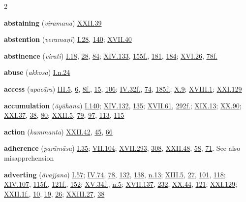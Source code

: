 \begin{multicols}{2}
\begin{vismHanging}
\par\textbf{abstaining} (\emph{viramana}) \hyperlink{XXII.39}{XXII.39}{}
\par\textbf{abstention} (\emph{veramaṇī}) \hyperlink{I.28}{I.28}{}, \hyperlink{I.140}{140}{}; \hyperlink{XVII.40}{XVII.40}{}
\par\textbf{abstinence} (\emph{virati}) \hyperlink{I.18}{I.18}{}, \hyperlink{I.28}{28}{}, \hyperlink{I.84}{84}{}; \hyperlink{XIV.133}{XIV.133}{}, \hyperlink{XIV.155}{155f.}{}, \hyperlink{XIV.181}{181}{}, \hyperlink{XIV.184}{184}{}; \hyperlink{XVI.26}{XVI.26}{}, \hyperlink{XVI.78}{78f.}{}
\par\textbf{abuse} (\emph{akkosa}) \hyperlink{I.n24}{I.n.24}{}
\par\textbf{access} (\emph{upacāra}) \hyperlink{III.5}{III.5}{}, \hyperlink{III.6}{6}{}, \hyperlink{III.8}{8f.}{}, \hyperlink{III.15}{15}{}, \hyperlink{III.106}{106}{}; \hyperlink{IV.32}{IV.32f.}{}, \hyperlink{IV.74}{74}{}, \hyperlink{IV.185}{185f.}{}; \hyperlink{X.9}{X.9}{}; \hyperlink{XVIII.1}{XVIII.1}{}; \hyperlink{XXI.129}{XXI.129}{}
\par\textbf{accumulation} (\emph{āyūhana}) \hyperlink{I.140}{I.140}{}; \hyperlink{XIV.132}{XIV.132}{}, \hyperlink{XIV.135}{135}{}; \hyperlink{XVII.61}{XVII.61}{}, \hyperlink{XVII.292}{292f.}{}; \hyperlink{XIX.13}{XIX.13}{}; \hyperlink{XX.90}{XX.90}{}; \hyperlink{XXI.37}{XXI.37}{}, \hyperlink{XXI.38}{38}{}, \hyperlink{XXI.80}{80}{}; \hyperlink{XXII.5}{XXII.5}{}, \hyperlink{XXII.79}{79}{}, \hyperlink{XXII.97}{97}{}, \hyperlink{XXII.113}{113}{}, \hyperlink{XXII.115}{115}{}
\par\textbf{action} (\emph{kammanta}) \hyperlink{XXII.42}{XXII.42}{}, \hyperlink{XXII.45}{45}{}, \hyperlink{XXII.66}{66}{}
\par\textbf{adherence} (\emph{parāmāsa}) \hyperlink{I.35}{I.35}{}; \hyperlink{VII.104}{VII.104}{}; \hyperlink{XVII.293}{XVII.293}{}, \hyperlink{XVII.308}{308}{}, \hyperlink{XXII.48}{XXII.48}{}, \hyperlink{XXII.58}{58}{}, \hyperlink{XXII.71}{71}{}. See also misapprehension 
\par\textbf{adverting} (\emph{āvajjana}) \hyperlink{I.57}{I.57}{}; \hyperlink{IV.74}{IV.74}{}, \hyperlink{IV.78}{78}{}, \hyperlink{IV.132}{132}{}, \hyperlink{IV.138}{138}{}, \hyperlink{IV.n13}{n.13}{}; \hyperlink{XIII.5}{XIII.5}{}, \hyperlink{XIII.27}{27}{}, \hyperlink{XIII.101}{101}{}, \hyperlink{XIII.118}{118}{}; \hyperlink{XIV.107}{XIV.107}{}, \hyperlink{XIV.115}{115f.}{}, \hyperlink{XIV.121}{121f.}{}, \hyperlink{XIV.152}{152}{}; \hyperlink{XV.34}{XV.34f.}{}, \hyperlink{XV.n5}{n.5}{}; \hyperlink{XVII.137}{XVII.137}{}, \hyperlink{XVII.232}{232}{}; \hyperlink{XX.44}{XX.44}{}, \hyperlink{XX.121}{121}{}; \hyperlink{XXI.129}{XXI.129}{}; \hyperlink{XXII.1}{XXII.1f.}{}, \hyperlink{XXII.10}{10}{}, \hyperlink{XXII.19}{19}{}, \hyperlink{XXII.26}{26}{}; \hyperlink{XXIII.27}{XXIII.27}{}, \hyperlink{XXIII.38}{38}{}

\end{vismHanging}
\end{multicols}
